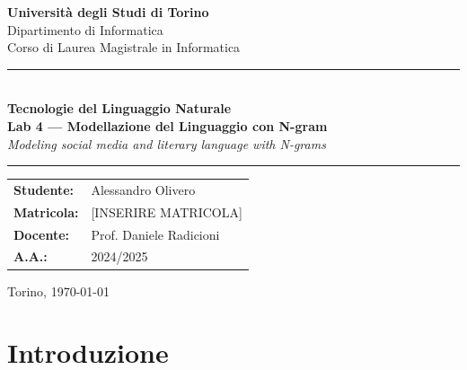 \documentclass[12pt, a4paper]{article}
\begin{document}

\begin{titlepage}
    \centering
    \vspace*{1cm}

    {\Large \textbf{Università degli Studi di Torino}}\\
    \vspace{0.3cm}
    {\large Dipartimento di Informatica}\\
    \vspace{0.3cm}
    {\large Corso di Laurea Magistrale in Informatica}

    \vspace{2cm}

    \rule{\linewidth}{0.5mm}\\
    \vspace{0.5cm}
    {\LARGE \textbf{Tecnologie del Linguaggio Naturale}}\\
    \vspace{0.3cm}
    {\Large \textbf{Lab 4 --- Modellazione del Linguaggio con N-gram}}\\
    \vspace{0.3cm}
    {\large \textit{Modeling social media and literary language with N-grams}}\\
    \vspace{0.5cm}
    \rule{\linewidth}{0.5mm}

    \vspace{2cm}

    \begin{tabular}{ll}
        \textbf{Studente:}  & Alessandro Olivero \\
        \textbf{Matricola:} & [INSERIRE MATRICOLA] \\
        \textbf{Docente:}   & Prof. Daniele Radicioni \\
        \textbf{A.A.:}      & 2024/2025 \\
    \end{tabular}

    \vfill
    {\large Torino, \today}
\end{titlepage}

\tableofcontents
\newpage

\section{Introduzione}
\end{document}
